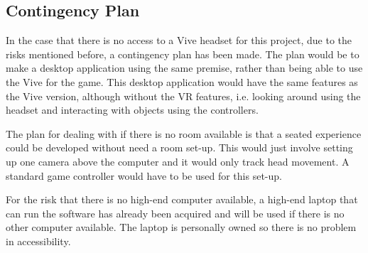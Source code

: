 \subsection{Contingency Plan}\label{subsec:conPlan}
In the case that there is no access to a Vive headset for this project, due to the risks mentioned before, a contingency plan has been made. The plan would be to make a desktop application using the same premise, rather than being able to use the Vive for the game. This desktop application would have the same features as the Vive version, although without the VR features, i.e. looking around using the headset and interacting with objects using the controllers.
\newline
\par
The plan for dealing with if there is no room available is that a seated experience could be developed without need a room set-up. This would just involve setting up one camera above the computer and it would only track head movement. A standard game controller would have to be used for this set-up.
\newline
\par
For the risk that there is no high-end computer available, a high-end laptop that can run the software has already been acquired and will be used if there is no other computer available. The laptop is personally owned so there is no problem in accessibility.